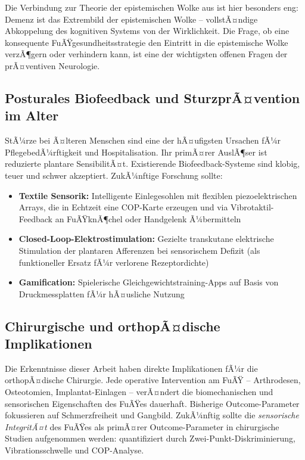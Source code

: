 ﻿\documentclass[12pt,a4paper]{report}
\theoremstyle{plain}
\theoremstyle{definition}
\theoremstyle{remark}
\begin{document}
Die Verbindung zur Theorie der epistemischen Wolke aus \cite{epp2026brn}
ist hier besonders eng: Demenz ist das Extrembild der epistemischen
Wolke -- vollstÃ¤ndige Abkoppelung des kognitiven Systems von der
Wirklichkeit. Die Frage, ob eine konsequente FuÃŸgesundheitsstrategie
den Eintritt in die epistemische Wolke verzÃ¶gern oder verhindern kann,
ist eine der wichtigsten offenen Fragen der prÃ¤ventiven Neurologie.

\subsection{Posturales Biofeedback und SturzprÃ¤vention im Alter}

StÃ¼rze bei Ã¤lteren Menschen sind eine der hÃ¤ufigsten Ursachen
fÃ¼r PflegebedÃ¼rftigkeit und Hospitalisation. Ihr primÃ¤rer AuslÃ¶ser
ist reduzierte plantare SensibilitÃ¤t. Existierende Biofeedback-Systeme
sind klobig, teuer und schwer akzeptiert. ZukÃ¼nftige Forschung sollte:

\begin{itemize}
\item \textbf{Textile Sensorik:} Intelligente Einlegesohlen mit
  flexiblen piezoelektrischen Arrays, die in Echtzeit eine
  COP-Karte erzeugen und via Vibrotaktil-Feedback an FuÃŸknÃ¶chel
  oder Handgelenk Ã¼bermitteln
\item \textbf{Closed-Loop-Elektrostimulation:} Gezielte transkutane
  elektrische Stimulation der plantaren Afferenzen bei sensorischem
  Defizit (als funktioneller Ersatz fÃ¼r verlorene Rezeptordichte)
\item \textbf{Gamification:} Spielerische Gleichgewichtstraining-Apps
  auf Basis von Druckmessplatten fÃ¼r hÃ¤usliche Nutzung
\end{itemize}

\subsection{Chirurgische und orthopÃ¤dische Implikationen}

Die Erkenntnisse dieser Arbeit haben direkte Implikationen fÃ¼r
die orthopÃ¤dische Chirurgie. Jede operative Intervention am FuÃŸ --
Arthrodesen, Osteotomien, Implantat-Einlagen -- verÃ¤ndert die
biomechanischen und sensorischen Eigenschaften des FuÃŸes dauerhaft.
Bisherige Outcome-Parameter fokussieren auf Schmerzfreiheit und
Gangbild. ZukÃ¼nftig sollte die \emph{sensorische IntegritÃ¤t} des
FuÃŸes als primÃ¤rer Outcome-Parameter in chirurgische Studien
aufgenommen werden: quantifiziert durch Zwei-Punkt-Diskriminierung,
Vibrationsschwelle und COP-Analyse.
\end{document}
